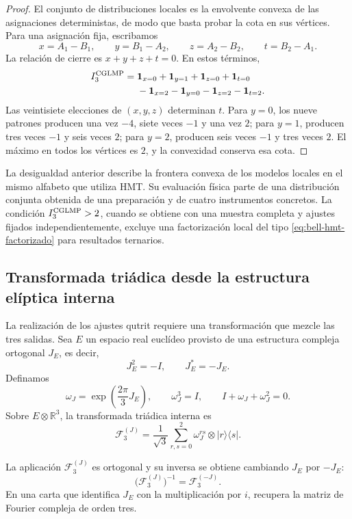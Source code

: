 \begin{proof}
El conjunto de distribuciones locales es la envolvente convexa de las asignaciones
deterministas, de modo que basta probar la cota en sus vértices. Para una asignación
fija, escribamos
\[
 x=A_1-B_1,\qquad y=B_1-A_2,\qquad
 z=A_2-B_2,\qquad t=B_2-A_1.
\]
La relación de cierre es \(x+y+z+t=0\). En estos términos,
\[
\begin{aligned}
 I_3^{\rm CGLMP}={}&
 \mathbf1_{x=0}+\mathbf1_{y=1}
 +\mathbf1_{z=0}+\mathbf1_{t=0}\\
 &-\mathbf1_{x=2}-\mathbf1_{y=0}
 -\mathbf1_{z=2}-\mathbf1_{t=2}.
\end{aligned}
\]
Las veintisiete elecciones de \((x,y,z)\) determinan \(t\). Para
\(y=0\), los nueve patrones producen una vez \(-4\), siete veces \(-1\) y
una vez \(2\); para \(y=1\), producen tres veces \(-1\) y seis veces \(2\);
para \(y=2\), producen seis veces \(-1\) y tres veces \(2\). El máximo en
todos los vértices es \(2\), y la convexidad conserva esa cota.
\end{proof}

La desigualdad anterior describe la frontera convexa de los modelos locales en el
mismo alfabeto que utiliza HMT. Su evaluación física parte de una distribución conjunta obtenida de una
preparación y de cuatro instrumentos concretos. La condición
\(I_3^{\rm CGLMP}>2\), cuando se obtiene con una muestra completa y ajustes fijados
independientemente, excluye una factorización local del tipo
\eqref{eq:bell-hmt-factorizado} para resultados ternarios.

\subsection{Transformada triádica desde la estructura elíptica interna}

La realización de los ajustes qutrit requiere una transformación que mezcle las
tres salidas. Sea \(E\) un espacio real euclídeo provisto de una estructura
compleja ortogonal \(J_E\), es decir,
\[
 J_E^2=-I,
 \qquad
 J_E^{\!*}=-J_E.
\]
Definamos
\[
 \omega_J=\exp\!\left(\frac{2\pi}{3}J_E\right),
 \qquad
 \omega_J^3=I,
 \qquad
 I+\omega_J+\omega_J^2=0.
\]
Sobre \(E\otimes\mathbb R^3\), la transformada triádica interna es
\begin{equation}
 \mathcal F_3^{(J)}
 =\frac1{\sqrt3}\sum_{r,s=0}^{2}
   \omega_J^{rs}\otimes|r\rangle\langle s|.
 \label{eq:fourier-triadica-interna}
\end{equation}

\begin{proposition}
\label{prop:fourier-triadica-unitaria}
La aplicación \(\mathcal F_3^{(J)}\) es ortogonal y su inversa se obtiene
cambiando \(J_E\) por \(-J_E\):
\[
 \bigl(\mathcal F_3^{(J)}\bigr)^{-1}
 =\mathcal F_3^{(-J)}.
\]
En una carta que identifica \(J_E\) con la multiplicación por \(i\), recupera la
matriz de Fourier compleja de orden tres.
\end{proposition}


